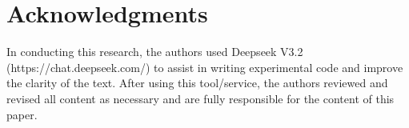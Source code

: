 \section*{Acknowledgments}
\label{sec:acknowledgments}

In conducting this research, the authors used Deepseek V3.2 (https://chat.deepseek.com/) to assist in writing experimental code and improve the clarity of the text. After using this tool/service, the authors reviewed and revised all content as necessary and are fully responsible for the content of this paper.